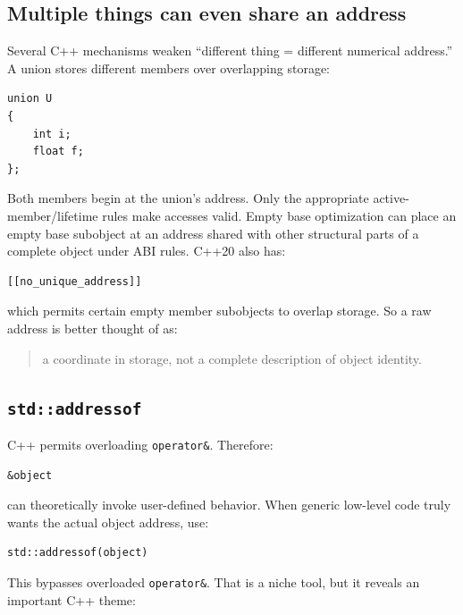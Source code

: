 \subsection{Multiple things can even share an address}\label{05-engine-i-ch002-multiple-things-can-even-share-an-address}

Several C++ mechanisms weaken ``different thing = different numerical address.'' A union stores different members over overlapping storage:

\begin{verbatim}
union U
{
    int i;
    float f;
};
\end{verbatim}

Both members begin at the union's address. Only the appropriate active-member/lifetime rules make accesses valid. Empty base optimization can place an empty base subobject at an address shared with other structural parts of a complete object under ABI rules. C++20 also has:

\begin{verbatim}
[[no_unique_address]]
\end{verbatim}

which permits certain empty member subobjects to overlap storage. So a raw address is better thought of as:

\begin{quote}
a coordinate in storage, not a complete description of object identity.
\end{quote}

\subsection{\texorpdfstring{\texttt{std::addressof}}{std::addressof}}\label{05-engine-i-ch002-stdaddressof}

C++ permits overloading \texttt{operator\&}. Therefore:

\begin{verbatim}
&object
\end{verbatim}

can theoretically invoke user-defined behavior. When generic low-level code truly wants the actual object address, use:

\begin{verbatim}
std::addressof(object)
\end{verbatim}

This bypasses overloaded \texttt{operator\&}. That is a niche tool, but it reveals an important C++ theme:

